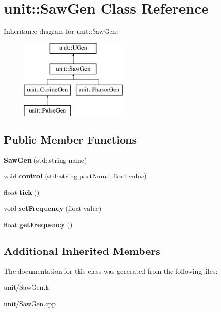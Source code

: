 \hypertarget{classunit_1_1SawGen}{}\section{unit\+:\+:Saw\+Gen Class Reference}
\label{classunit_1_1SawGen}
Inheritance diagram for unit\+:\+:Saw\+Gen\+:\begin{figure}[H]
\begin{center}
\leavevmode
\includegraphics[height=4.000000cm]{classunit_1_1SawGen}
\end{center}
\end{figure}
\subsection*{Public Member Functions}
\begin{DoxyCompactItemize}
\item 
{\bfseries Saw\+Gen} (std\+::string name)\hypertarget{classunit_1_1SawGen_a24c35afc1bdb237a8a5d1eb3888ce0bc}{}\label{classunit_1_1SawGen_a24c35afc1bdb237a8a5d1eb3888ce0bc}

\item 
void {\bfseries control} (std\+::string port\+Name, float value)\hypertarget{classunit_1_1SawGen_a515f6eb82a1a97ee434144b8c58133b8}{}\label{classunit_1_1SawGen_a515f6eb82a1a97ee434144b8c58133b8}

\item 
float {\bfseries tick} ()\hypertarget{classunit_1_1SawGen_a18c6704aec8f20a5605ff72d674c7516}{}\label{classunit_1_1SawGen_a18c6704aec8f20a5605ff72d674c7516}

\item 
void {\bfseries set\+Frequency} (float value)\hypertarget{classunit_1_1SawGen_a1a77058c93e7f7b3fe4b355953674678}{}\label{classunit_1_1SawGen_a1a77058c93e7f7b3fe4b355953674678}

\item 
float {\bfseries get\+Frequency} ()\hypertarget{classunit_1_1SawGen_a0f08973bebb28aa1a059ccce09e5ebdf}{}\label{classunit_1_1SawGen_a0f08973bebb28aa1a059ccce09e5ebdf}

\end{DoxyCompactItemize}
\subsection*{Additional Inherited Members}


The documentation for this class was generated from the following files\+:\begin{DoxyCompactItemize}
\item 
unit/Saw\+Gen.\+h\item 
unit/Saw\+Gen.\+cpp\end{DoxyCompactItemize}
